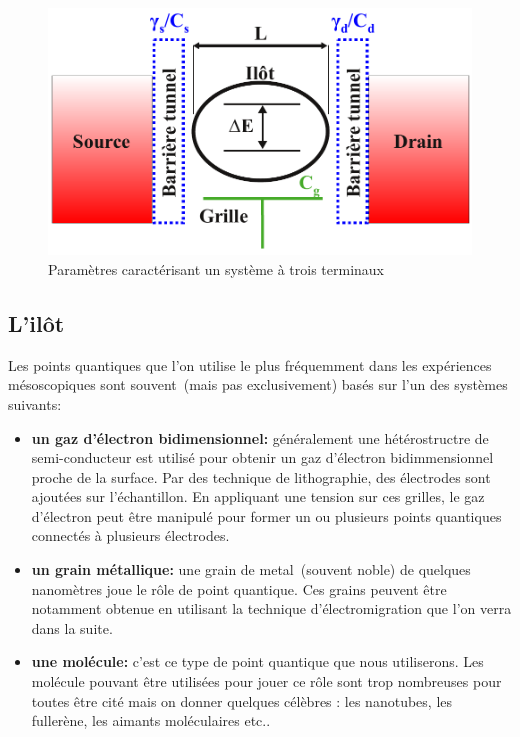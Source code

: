 \begin{figure}
\includegraphics[scale=1]{Theorie/Transport/figure1/figure1ThTr.pdf} 
\caption{Paramètres caractérisant un système à trois terminaux}
\label{description_systeme}
\end{figure}



\subsection{L'il\^ot}
Les points quantiques que l'on utilise le plus fréquemment dans les expériences mésoscopiques sont souvent~(mais pas exclusivement) basés sur l'un des systèmes suivants:
\begin{itemize}
\item \textbf{un gaz d'électron bidimensionnel:} généralement une hétérostructre de semi-conducteur est utilisé pour obtenir un gaz d'électron bidimmensionnel proche de la surface. Par des technique de lithographie, des électrodes sont ajoutées sur l'échantillon. En appliquant une tension sur ces grilles, le gaz d'électron peut \^etre manipulé pour former un ou plusieurs points quantiques connectés à plusieurs électrodes.
\item \textbf{un grain métallique:} une grain de metal~(souvent noble) de quelques nanomètres joue le rôle de point quantique. Ces grains peuvent \^etre notamment obtenue en utilisant la technique d'électromigration que l'on verra dans la suite.
\item \textbf{une molécule:} c'est ce type de point quantique que nous utiliserons. Les molécule pouvant \^etre utilisées pour jouer ce r\^ole sont trop nombreuses pour toutes \^etre cité mais on donner quelques célèbres : les nanotubes, les fullerène, les aimants moléculaires etc.. \newline
\end{itemize}

